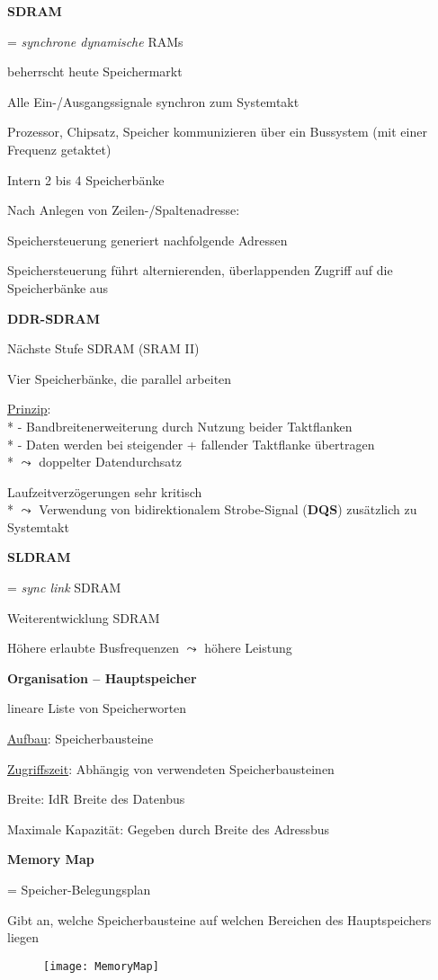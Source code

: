\textbf{SDRAM}
\begin{items}
	\item = \emph{synchrone dynamische} RAMs
	\item beherrscht heute Speichermarkt
	\item Alle Ein-/Ausgangssignale synchron zum Systemtakt
	\item Prozessor, Chipsatz, Speicher kommunizieren über ein Bussystem (mit einer Frequenz getaktet)
	\item Intern 2 bis 4 Speicherbänke
	\item Nach Anlegen von Zeilen-/Spaltenadresse:
	\begin{enumeration}
		\item Speichersteuerung generiert nachfolgende Adressen
		\item Speichersteuerung führt alternierenden, überlappenden Zugriff auf die Speicherbänke aus
	\end{enumeration}
\end{items}

\textbf{DDR-SDRAM}
\begin{items}
	\item Nächste Stufe SDRAM (SRAM II)
	\item Vier Speicherbänke, die parallel arbeiten
	\item \underline{Prinzip}: \\*
	 	- Bandbreitenerweiterung durch Nutzung beider Taktflanken \\*
	 	- Daten werden bei steigender + fallender Taktflanke übertragen \\*
	 	\( \leadsto \) doppelter Datendurchsatz
	\item Laufzeitverzögerungen sehr kritisch \\*
		\( \leadsto \) Verwendung von bidirektionalem Strobe-Signal (\textbf{DQS}) zusätzlich zu Systemtakt
\end{items}

\newpage

\textbf{SLDRAM}
\begin{items}
	\item = \emph{sync link} SDRAM
	\item Weiterentwicklung SDRAM
	\item Höhere erlaubte Busfrequenzen \( \leadsto \) höhere Leistung
\end{items}

\textbf{Organisation -- Hauptspeicher}
\begin{items}
	\item lineare Liste von Speicherworten
	\item \underline{Aufbau}: Speicherbausteine
	\item \underline{Zugriffszeit}: Abhängig von verwendeten Speicherbausteinen
	\item Breite: IdR Breite des Datenbus
	\item Maximale Kapazität: Gegeben durch Breite des Adressbus
\end{items}

\textbf{Memory Map}
\begin{items}
	\item = Speicher-Belegungsplan
	\item Gibt an, welche Speicherbausteine auf welchen Bereichen des Hauptspeichers liegen
\end{items}
\begin{figure}[H]\centering\label{MemoryMap}\texttt{[image: MemoryMap]}\end{figure}